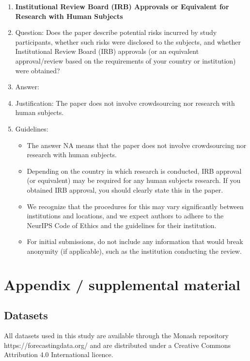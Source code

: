 \documentclass{article}
\begin{document}
\begin{enumerate}
\item {\bf Institutional Review Board (IRB) Approvals or Equivalent for Research with Human Subjects}
    \item[] Question: Does the paper describe potential risks incurred by study participants, whether such risks were disclosed to the subjects, and whether Institutional Review Board (IRB) approvals (or an equivalent approval/review based on the requirements of your country or institution) were obtained?
    \item[] Answer: \answerNA{} %
    \item[] Justification: The paper does not involve crowdsourcing nor research with human subjects.
    \item[] Guidelines: 
    \begin{itemize}
        \item The answer NA means that the paper does not involve crowdsourcing nor research with human subjects.
        \item Depending on the country in which research is conducted, IRB approval (or equivalent) may be required for any human subjects research. If you obtained IRB approval, you should clearly state this in the paper. 
        \item We recognize that the procedures for this may vary significantly between institutions and locations, and we expect authors to adhere to the NeurIPS Code of Ethics and the guidelines for their institution. 
        \item For initial submissions, do not include any information that would break anonymity (if applicable), such as the institution conducting the review.
    \end{itemize}

\end{enumerate}


\FloatBarrier
\newpage
\appendix
\section{Appendix / supplemental material}
\subsection{Datasets}
All datasets used in this study are available through the Monash repository https://forecastingdata.org/ 
and are distributed under a Creative Commons Attribution 4.0 International licence.
\end{document}

